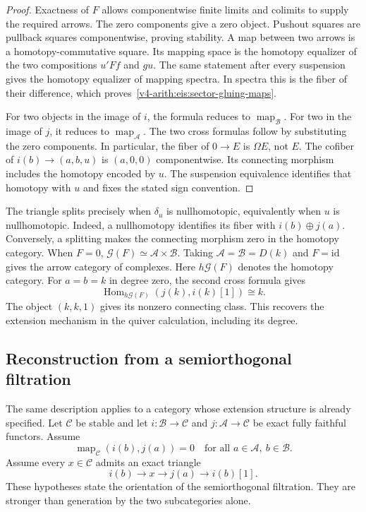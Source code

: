 \begin{proof}
Exactness of $F$ allows componentwise finite limits and colimits to
supply the required arrows. The zero components give a zero object.
Pushout squares are pullback squares componentwise, proving stability.
A map between two arrows is a homotopy-commutative square. Its mapping
space is the homotopy equalizer of the two compositions $u'Ff$ and $gu$.
The same statement after every suspension gives the homotopy equalizer
of mapping spectra. In spectra this is the fiber of their difference,
which proves~\eqref{v4-arith:eis:sector-gluing-maps}.

For two objects in the image of $i$, the formula reduces to
$\operatorname{map}_{\mathcal B}$. For two in the image of $j$, it
reduces to $\operatorname{map}_{\mathcal A}$.
The two cross formulas follow by substituting the zero components.
In particular, the fiber of $0\to E$ is $\Omega E$, not $E$.
The cofiber of $i(b)\to(a,b,u)$ is $(a,0,0)$ componentwise.
Its connecting morphism includes the homotopy encoded by $u$.
The suspension equivalence identifies that homotopy with $u$ and fixes
the stated sign convention.
\end{proof}

The triangle splits precisely when $\delta_u$ is nullhomotopic,
equivalently when $u$ is nullhomotopic. Indeed, a nullhomotopy identifies
its fiber with $i(b)\oplus j(a)$. Conversely, a splitting makes the
connecting morphism zero in the homotopy category. When $F=0$,
$\mathcal G(F)\simeq\mathcal A\times\mathcal B$.
Taking $\mathcal A=\mathcal B=D(k)$ and $F=\mathrm{id}$ gives the
arrow category of complexes. Here $h\mathcal G(F)$ denotes the homotopy category.
For $a=b=k$ in degree zero, the second
cross formula gives
\[
 \operatorname{Hom}_{h\mathcal G(F)}(j(k),i(k)[1])\cong k.
\]
The object $(k,k,1)$ gives its nonzero connecting class. This recovers
the extension mechanism in the quiver calculation, including its degree.

\subsection{Reconstruction from a semiorthogonal filtration}

The same description applies to a category whose extension structure is
already specified. Let $\mathcal C$ be stable and let
$i:\mathcal B\to\mathcal C$ and $j:\mathcal A\to\mathcal C$ be exact
fully faithful functors. Assume
\[
 \operatorname{map}_{\mathcal C}(i(b),j(a))=0
 \quad\text{for all }a\in\mathcal A,\ b\in\mathcal B.
\]
Assume every $x\in\mathcal C$ admits an exact triangle
\[
 i(b)\longrightarrow x\longrightarrow j(a)\longrightarrow i(b)[1].
\]
These hypotheses state the orientation of the semiorthogonal filtration.
They are stronger than generation by the two subcategories alone.

